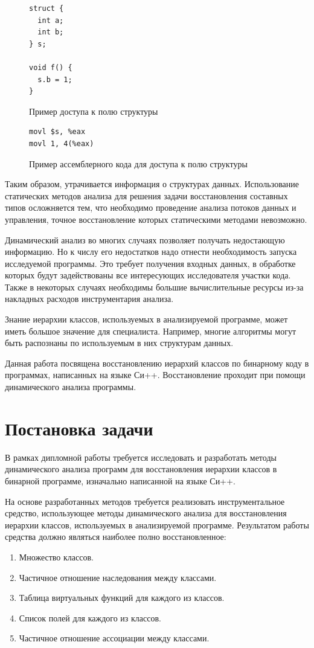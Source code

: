 \documentclass[a4paper,12pt,russian]{article}
\begin{document}
\begin{figure}
\begin{lstlisting}
struct {
  int a;
  int b;
} s;

void f() {
  s.b = 1;
}
\end{lstlisting}
\caption{Пример доступа к полю структуры}
\label{field_ref_lst}
\end{figure}

\begin{figure}
\begin{lstlisting}[language={[x86masm]Assembler}]
movl $s, %eax
movl 1, 4(%eax)
\end{lstlisting}
\caption{Пример ассемблерного кода для доступа к полю структуры}
\label{field_ref_asm_lst}
\end{figure}

Таким образом, утрачивается информация о структурах данных.
Использование статических методов анализа для решения задачи восстановления составных типов осложняется тем, что необходимо проведение анализа потоков данных и управления, точное восстановление которых статическими методами невозможно.

Динамический анализ во многих случаях позволяет получать недостающую информацию. Но к числу его недостатков надо отнести необходимость запуска исследуемой программы.
Это требует получения входных данных, в обработке которых будут задействованы все интересующих исследователя участки кода.
Также в некоторых случаях необходимы большие вычислительные ресурсы из-за накладных расходов инструментария анализа.

Знание иерархии классов, используемых в анализируемой программе, может иметь большое значение для специалиста. Например, многие алгоритмы могут быть распознаны по используемым в них структурам данных.

Данная работа посвящена восстановлению иерархий классов по бинарному коду в программах, написанных на языке Си++.
Восстановление проходит при помощи динамического анализа программы.

\newpage
\section{Постановка задачи}
В рамках дипломной работы требуется исследовать и разработать методы динамического анализа программ для восстановления иерархии классов в бинарной программе, изначально написанной на языке Си++.

На основе разработанных методов требуется реализовать инструментальное средство, использующее методы динамического анализа для восстановления иерархии классов, используемых в анализируемой программе.
Результатом работы средства должно являться наиболее полно восстановленное:
\begin{enumerate}
\item Множество классов.
\item Частичное отношение наследования между классами.
\item Таблица виртуальных функций для каждого из классов.
\item Список полей для каждого из классов.
\item Частичное отношение ассоциации между классами.
\end{enumerate}
\end{document}
